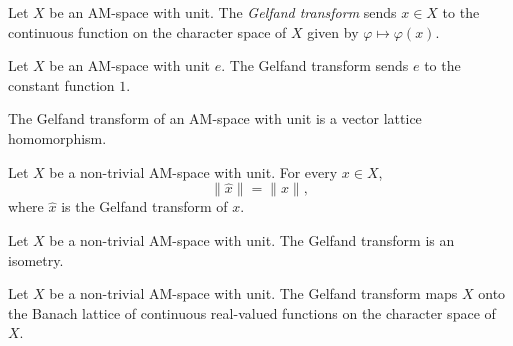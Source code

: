 \begin{definition}
\label{def:amSpaceWithUnit-gelfand}
\leanok
{}
Let $X$ be an AM-space with unit. The \emph{Gelfand transform}
sends $x \in X$ to the continuous function on the character space
of $X$ given by $\varphi \mapsto \varphi(x)$.
\end{definition}

\begin{lemma}
\label{lem:amSpaceWithUnit-gelfand-unit}
\leanok
{}
Let $X$ be an AM-space with unit $e$. The Gelfand transform sends
$e$ to the constant function $1$.
\end{lemma}

\begin{theorem}
\label{thm:amSpaceWithUnit-gelfand-isVecLatHom}
\leanok
{}
The Gelfand transform of an AM-space with unit is a vector lattice
homomorphism.
\end{theorem}

\begin{theorem}
\label{thm:amSpaceWithUnit-norm-gelfand}
\leanok
{}
Let $X$ be a non-trivial AM-space with unit. For every $x \in X$,
\[
  \lVert \widehat{x}\rVert = \lVert x\rVert,
\]
where $\widehat{x}$ is the Gelfand transform of $x$.
\end{theorem}

\begin{theorem}
\label{thm:amSpaceWithUnit-gelfand-isometry}
\leanok
{}
Let $X$ be a non-trivial AM-space with unit. The Gelfand transform
is an isometry.
\end{theorem}

\begin{theorem}
\label{thm:amSpaceWithUnit-gelfand-surjective}
\leanok
{}
Let $X$ be a non-trivial AM-space with unit. The Gelfand transform
maps $X$ onto the Banach lattice of continuous real-valued functions
on the character space of $X$.
\end{theorem}

